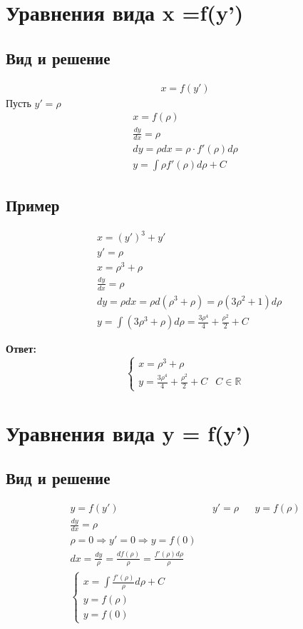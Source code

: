 \documentclass[fontsize=10pt,a4paper,fleqn]{scrreprt} %
\numberwithin{equation}{section}
\begin{document}
\section{Уравнения вида  x =f(y')}
\label{sec:derarg}
\subsection{Вид и решение}
\begin{align}
  x = f(y')
\end{align}
Пусть $y' = \rho$
\begin{align*}
x = f(\rho)\\
\frac{dy}{dx} = \rho\\
dy = \rho dx = \rho \cdot f'(\rho)d\rho\\
y = \int \rho f'(\rho)d\rho + C
\end{align*}

\subsection{Пример}
\begin{align*}
&  x = (y')^3 + y'\\
&  y' = \rho\\
&  x = \rho^3 + \rho\\
&  \frac{dy}{dx} = \rho\\
&  dy = \rho dx = \rho d(\rho^3+\rho) = \rho(3\rho^2+1)d\rho\\
&  y = \int(3\rho^3+\rho)d\rho = \frac{3\rho^4}4 + \frac{\rho^2}2 + C
\end{align*}

{\bfseries Ответ:}
\begin{equation*}
\left\{
  \begin{array}{ll}
    x = \rho^3 + \rho\\
    y = \frac{3\rho^4}4 + \frac{\rho^2}2 + C & C \in \mathbb{R}
  \end{array}
\right.
\end{equation*}



\section{Уравнения вида y = f(y')}

\subsection{Вид и решение}
\begin{align*}
  y = f(y')&&
  y' = \rho&&
  y = f(\rho)\\
  \frac{dy}{dx} = \rho\\
  \rho = 0 \Rightarrow y' = 0 \Rightarrow y = f(0) \\
  dx = \frac{dy}\rho = \frac{df(\rho)}\rho = \frac{f'(\rho)d\rho}\rho\\
  \begin{cases}
    x = \int\frac{f'(\rho)}\rho d\rho + C\\
    y = f(\rho)\\
    y = f(0)
  \end{cases}
\end{align*}
\end{document}
